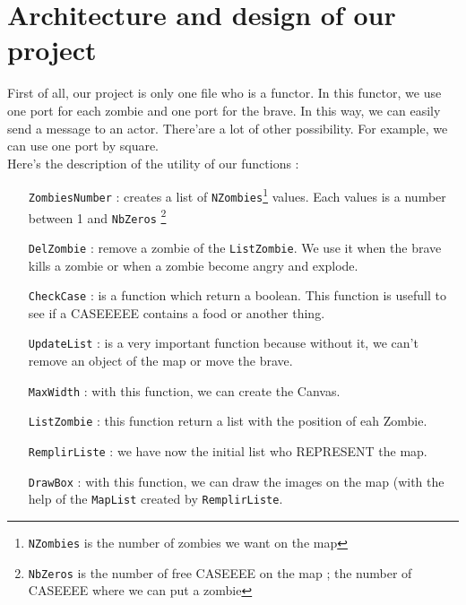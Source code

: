\section*{Architecture and design of our project}
First of all, our project is only one file who is a functor. In this functor, we use one port for each zombie and one port for the brave. In this way, we can easily send a message to an actor. There'are a lot of other possibility. For example, we can use one port by square.\\
Here's the description of the utility of our functions :\\
\begin{itemize}
\item[\texttt{ZombiesNumber} :] creates a list of \texttt{NZombies}\footnote{\texttt{NZombies} is the number of zombies we want on the map} values. Each values is a number between 1 and \texttt{NbZeros} \footnote{\texttt{NbZeros} is the number of free CASEEEE on the map ; the number of CASEEEE where we can put a zombie}
\\

\item[\texttt{DelZombie} :] remove a zombie of the \texttt{ListZombie}. We use it when the brave kills a zombie or when a zombie become angry and explode.
\\

\item[\texttt{CheckCase} :] is a function which return a boolean. This function is usefull to see if a CASEEEEE contains a food or another thing.
\\

\item[\texttt{UpdateList} :] is a very important function because without it, we can't remove an object of the map or move the brave.
\\

\item[\texttt{MaxWidth} :] with this function, we can create the Canvas.
\\

\item[\texttt{ListZombie} :] this function return a list with the position of eah Zombie.
\\

\item[\texttt{RemplirListe} :] we have now the initial list who REPRESENT the map.
\\

\item[\texttt{DrawBox} :] with this function, we can draw the images on the map (with the help of the \texttt{MapList} created by \texttt{RemplirListe}.
\\


\end{itemize}
